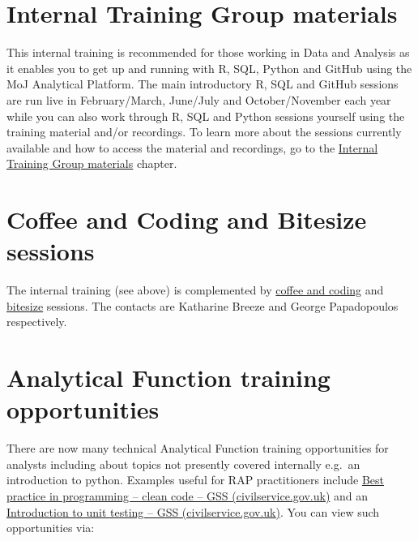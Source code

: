 \documentclass[
]{book}
\begin{document}
\hypertarget{internal-training-group-materials}{%
\section{Internal Training Group materials}\label{internal-training-group-materials}}

This internal training is recommended for those working in Data and Analysis as it enables you to get up and running with R, SQL, Python and GitHub using the MoJ Analytical Platform. The main introductory R, SQL and GitHub sessions are run live in February/March, June/July and October/November each year while you can also work through R, SQL and Python sessions yourself using the training material and/or recordings. To learn more about the sessions currently available and how to access the material and recordings, go to the \protect\hyperlink{ITG}{Internal Training Group materials} chapter.

\hypertarget{coffee-and-coding-and-bitesize-sessions}{%
\section{Coffee and Coding and Bitesize sessions}\label{coffee-and-coding-and-bitesize-sessions}}

The internal training (see above) is complemented by \href{https://web.microsoftstream.com/channel/f6aa6c5d-e90c-44b7-8ccc-28a318fa0630}{coffee and coding} and \href{https://web.microsoftstream.com/channel/5a6012a2-efd6-4b86-902d-98c864427caa}{bitesize} sessions. The contacts are Katharine Breeze and George Papadopoulos respectively.

\hypertarget{analytical-function-training-opportunities}{%
\section{Analytical Function training opportunities}\label{analytical-function-training-opportunities}}

There are now many technical Analytical Function training opportunities for analysts including about topics not presently covered internally e.g.~an introduction to python. Examples useful for RAP practitioners include \href{https://gss.civilservice.gov.uk/training/best-practice-in-programming-clean-code/}{Best practice in programming -- clean code -- GSS (civilservice.gov.uk)} and an \href{Introduction\%20to\%20unit\%20testing\%20–\%20GSS\%20(civilservice.gov.uk)}{Introduction to unit testing -- GSS (civilservice.gov.uk)}. You can view such opportunities via:
\end{document}
